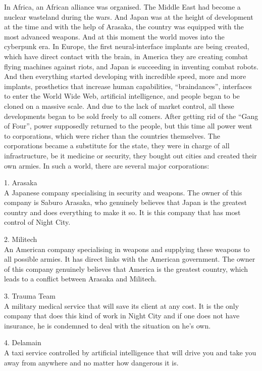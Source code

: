 \documentclass[10pt,twoside,english,a4paper]{article}
\begin{document}
 In Africa, an African alliance was organised. The Middle East had become a nuclear wasteland during the wars. And Japan was at the height of development at the time and with the help of Arasaka, the country was equipped with the most advanced weapons.
	And at this moment the world moves into the cyberpunk era. In Europe, the first neural-interface implants are being created, which have direct contact with the brain, in America they are creating combat flying machines against riots, and Japan is succeeding in inventing combat robots. And then everything started developing with incredible speed, more and more implants, prosthetics that increase human capabilities, “braindances”, interfaces to enter the World Wide Web, artificial intelligence, and people began to be cloned on a massive scale. And due to the lack of market control, all these developments began to be sold freely to all comers.
	After getting rid of the “Gang of Four”, power supposedly returned to the people, but this time all power went to corporations, which were richer than the countries themselves. The corporations became a substitute for the state, they were in charge of all infrastructure, be it medicine or security, they bought out cities and created their own armies.
	In such a world, there are several major corporations:

1. Arasaka\\
A Japanese company specialising in security and weapons. The owner of this company is Saburo Arasaka, who genuinely believes that Japan is the greatest country and does everything to make it so. It is this company that has most control of Night City.

2. Militech\\
	An American company specialising in weapons and supplying these weapons to all possible armies. It has direct links with the American government. The owner of this company genuinely believes that America is the greatest country, which leads to a conflict between Arasaka and Militech.

3. Trauma Team\\
	A military medical service that will save its client at any cost. It is the only company that does this kind of work in Night City and if one does not have insurance, he is condemned to deal with the situation on he's own.

4. Delamain\\
	A taxi service controlled by artificial intelligence that will drive you and take you away from anywhere and no matter how dangerous it is. 
\end{document}
